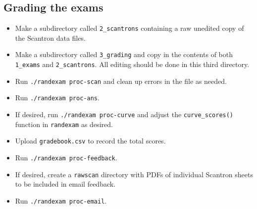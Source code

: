 \documentclass{article}
\begin{document}
\subsection{Grading the exams}

\begin{itemize}
\item Make a subdirectory called \texttt{2_scantrons} containing a raw
  unedited copy of the Scantron data files.
\item Make a subdirectory called \texttt{3_grading} and copy in the
  contents of both \texttt{1_exams} and \texttt{2_scantrons}. All
  editing should be done in this third directory.
\item Run \texttt{./randexam proc-scan} and clean up errors in the
  file as needed.
\item Run \texttt{./randexam proc-ans}.
\item If desired, run \texttt{./randexam proc-curve} and adjust the
  \texttt{curve_scores()} function in \texttt{randexam} as desired.
\item Upload \texttt{gradebook.csv} to record the total scores.
\item Run \texttt{./randexam proc-feedback}.
\item If desired, create a \verb+rawscan+ directory with PDFs of
  individual Scantron sheets to be included in email feedback.
\item Run \texttt{./randexam proc-email}.
\end{itemize}
\end{document}
